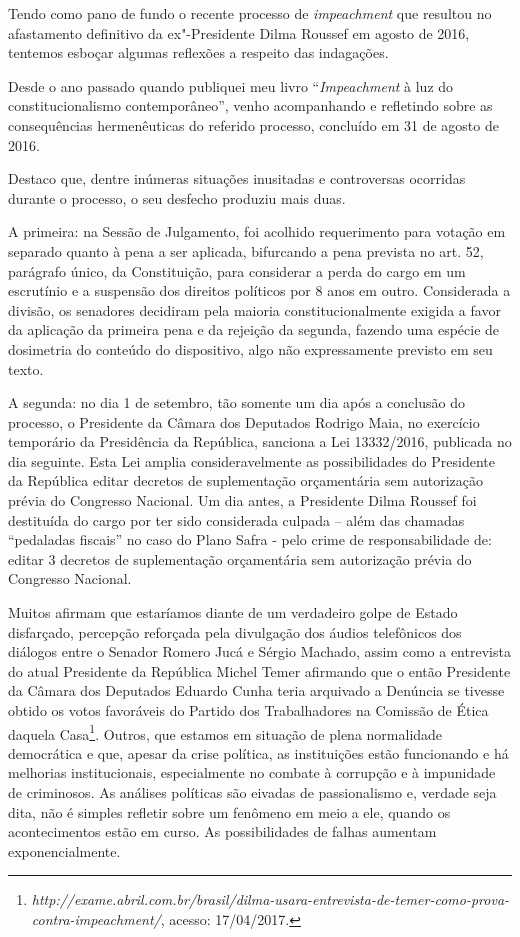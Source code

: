 Tendo como pano de fundo o recente processo de \emph{impeachment} que
resultou no afastamento definitivo da ex"-Presidente Dilma Roussef em
agosto de 2016, tentemos esboçar algumas reflexões a respeito das
indagações.

Desde o ano passado quando publiquei meu livro ``\emph{Impeachment} à
luz do constitucionalismo contemporâneo'', venho acompanhando e
refletindo sobre as consequências hermenêuticas do referido processo,
concluído em 31 de agosto de 2016.

Destaco que, dentre inúmeras situações inusitadas e controversas
ocorridas durante o processo, o seu desfecho produziu mais duas.

A primeira: na Sessão de Julgamento, foi acolhido requerimento para
votação em separado quanto à pena a ser aplicada, bifurcando a pena
prevista no art. 52, parágrafo único, da Constituição, para considerar a
perda do cargo em um escrutínio e a suspensão dos direitos políticos por
8 anos em outro. Considerada a divisão, os senadores decidiram pela
maioria constitucionalmente exigida a favor da aplicação da primeira
pena e da rejeição da segunda, fazendo uma espécie de dosimetria do
conteúdo do dispositivo, algo não expressamente previsto em seu texto.

A segunda: no dia 1 de setembro, tão somente um dia após a conclusão do
processo, o Presidente da Câmara dos Deputados Rodrigo Maia, no
exercício temporário da Presidência da República, sanciona a Lei
13332/2016, publicada no dia seguinte. Esta Lei amplia consideravelmente
as possibilidades do Presidente da República editar decretos de
suplementação orçamentária sem autorização prévia do Congresso Nacional.
Um dia antes, a Presidente Dilma Roussef foi destituída do cargo por ter
sido considerada culpada -- além das chamadas ``pedaladas fiscais'' no
caso do Plano Safra - pelo crime de responsabilidade de: editar 3
decretos de suplementação orçamentária sem autorização prévia do
Congresso Nacional.

Muitos afirmam que estaríamos diante de um verdadeiro golpe de Estado
disfarçado, percepção reforçada pela divulgação dos áudios telefônicos
dos diálogos entre o Senador Romero Jucá e Sérgio Machado, assim como a
entrevista do atual Presidente da República Michel Temer afirmando que o
então Presidente da Câmara dos Deputados Eduardo Cunha teria arquivado a
Denúncia se tivesse obtido os votos favoráveis do Partido dos
Trabalhadores na Comissão de Ética daquela Casa\footnote{\emph{http://exame.abril.com.br/brasil/dilma-usara-entrevista-de-temer-como-prova-contra-impeachment/},
  acesso: 17/04/2017.}. Outros, que estamos em situação de plena
normalidade democrática e que, apesar da crise política, as instituições
estão funcionando e há melhorias institucionais, especialmente no
combate à corrupção e à impunidade de criminosos. As análises políticas
são eivadas de passionalismo e, verdade seja dita, não é simples
refletir sobre um fenômeno em meio a ele, quando os acontecimentos estão
em curso. As possibilidades de falhas aumentam exponencialmente.

